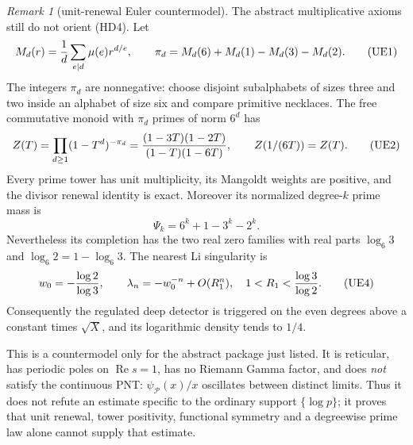 \documentclass[11pt]{amsart}
\theoremstyle{definition}
\theoremstyle{remark}
\newtheorem{remark}[theorem]{Remark}
\theoremstyle{definition}
\renewcommand{\Re}{\operatorname{Re}}
\begin{document}
\begin{remark}[unit-renewal Euler countermodel]
\label{rmk:unit-renewal-deep-countermodel}
The abstract multiplicative axioms still do not orient (HD4).  Let
\[
 M_d(r)={1\over d}\sum_{e\mid d}\mu(e)r^{d/e},\qquad
 \pi_d=M_d(6)+M_d(1)-M_d(3)-M_d(2).                     \tag{UE1}
\]
The integers \(\pi_d\) are nonnegative: choose disjoint subalphabets of
sizes three and two inside an alphabet of size six and compare primitive
necklaces.  The free commutative monoid with \(\pi_d\) primes of norm
\(6^d\) has
\[
 Z(T)=\prod_{d\ge1}(1-T^d)^{-\pi_d}
 ={(1-3T)(1-2T)\over(1-T)(1-6T)},\qquad
 Z(1/(6T))=Z(T).                                         \tag{UE2}
\]
Every prime tower has unit multiplicity, its Mangoldt weights are positive,
and the divisor renewal identity is exact.  Moreover its normalized
degree-$k$ prime mass is
\[
 \Psi_k=6^k+1-3^k-2^k.                                  \tag{UE3}
\]
Nevertheless its completion has the two real zero families with real parts
\(\log_6 3\) and \(\log_6 2=1-\log_6 3\).  The nearest Li singularity is
\[
 w_0=-{\log2\over\log3},\qquad
 \lambda_n=-w_0^{-n}+O(R_1^n),\quad
 1<R_1<{\log3\over\log2}.                             \tag{UE4}
\]
Consequently the regulated deep detector is triggered on the even degrees
above a constant times \(\sqrt X\), and its logarithmic density tends to
\(1/4\).

This is a countermodel only for the abstract package just listed.  It is
reticular, has periodic poles on \(\Re s=1\), has no Riemann Gamma factor,
and does \emph{not} satisfy the continuous PNT:
\(\psi_{\mathcal P}(x)/x\) oscillates between distinct limits.  Thus it
does not refute an estimate specific to the ordinary support \(\{\log p\}\);
it proves that unit renewal, tower positivity, functional symmetry and a
degreewise prime law alone cannot supply that estimate.
\end{remark}
\end{document}
